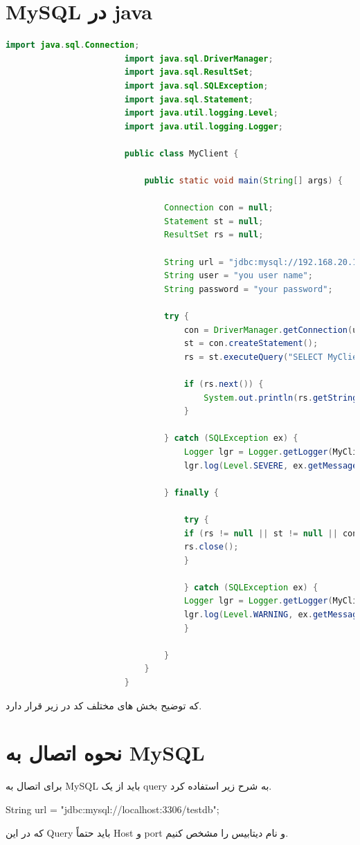 \documentclass[a4paper]{article}
\begin{document}
			\section{MySQL در java\\}
			
			
			\begin{latin}
				\begin{lstlisting}[language=Java]
						import java.sql.Connection;
						import java.sql.DriverManager;
						import java.sql.ResultSet;
						import java.sql.SQLException;
						import java.sql.Statement;
						import java.util.logging.Level;
						import java.util.logging.Logger;
						
						public class MyClient {
							
							public static void main(String[] args) {
								
								Connection con = null;
								Statement st = null;
								ResultSet rs = null;
								
								String url = "jdbc:mysql://192.168.20.154:3307/YourQuery";
								String user = "you user name";
								String password = "your password";
								
								try {
									con = DriverManager.getConnection(url, user, password);
									st = con.createStatement();
									rs = st.executeQuery("SELECT MyClient()");
									
									if (rs.next()) {
										System.out.println(rs.getString(1));
									}
									
								} catch (SQLException ex) {
									Logger lgr = Logger.getLogger(MyClient.class.getName());
									lgr.log(Level.SEVERE, ex.getMessage(), ex);
									
								} finally {
									
									try {
									if (rs != null || st != null || con != null) {
									rs.close();
									}
									
									} catch (SQLException ex) {
									Logger lgr = Logger.getLogger(MyClient.class.getName());
									lgr.log(Level.WARNING, ex.getMessage(), ex);
									}
									
								}
							}
						}		
				\end{lstlisting}
			\end{latin}
			که توضیح بخش های مختلف کد در زیر قرار دارد.
			\section{نحوه اتصال به MySQL }
			برای اتصال به MySQL باید از  یک query به شرح زیر استفاده کرد.\\
			\begin{latin}
				String url = "jdbc:mysql://localhost:3306/testdb"; 
			\end{latin}
			که در این Query باید حتماً
			Host 
			و 
			port
			و نام دیتابیس را مشخص کنیم.\\
\end{document}
